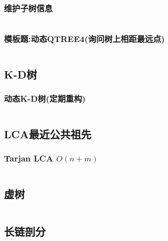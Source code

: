 \documentclass[a4paper, twoside]{article}
\begin{document}
\begin{multicols}{2}
				\subsubsection{维护子树信息}
					\inputminted{cpp}{../src/datastructure/LCT维护子树信息.cpp}
					
				\subsubsection[模板题:动态QTREE4]{模板题:动态QTREE4(询问树上相距最远点)}
						\inputminted{cpp}{../src/datastructure/动态QTREE4.cpp}
	
			\subsection{K-D树}

				\subsubsection{动态K-D树(定期重构)}
					\inputminted{cpp}{../src/datastructure/动态KD树.cpp}
	
	
	
			
			\subsection{LCA最近公共祖先}
				\subsubsection{Tarjan LCA $O(n + m)$}
					\inputminted{cpp}{../src/datastructure/tarjanlca.cpp}

			\subsection{虚树}
				\inputminted{cpp}{../src/datastructure/虚树.cpp}
	
			\subsection{长链剖分}
				\inputminted{cpp}{../src/datastructure/长链剖分.cpp}
	

\end{multicols}
\end{document}
